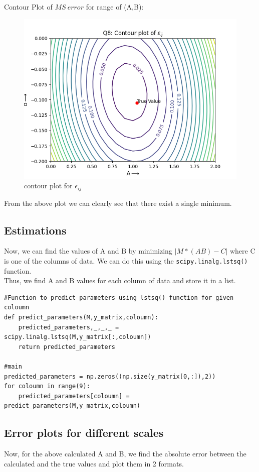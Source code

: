 \documentclass[11pt, a4paper]{article}
\begin{document}
Contour Plot of $MS\ error$ for range of (A,B):
\begin{figure}[!tbh]
   	\centering
   	\includegraphics[scale=0.7]{Q8.png}  %
   	\caption{contour plot for $\epsilon_{ij}$ }
   	\label{fig:Contour plot}
   \end{figure}
From the above plot we can clearly see that there exist a single minimum.


\subsection{Estimations}
\par Now, we can find the values of A and B by minimizing $|M*(AB)-C|$ where C is one of the columns of data. We can do this using the \verb|scipy.linalg.lstsq()| function.\\
Thus, we find A and B values for each column of data and store it in a list.
\begin{lstlisting}
#Function to predict parameters using lstsq() function for given coloumn
def predict_parameters(M,y_matrix,coloumn):
	predicted_parameters,_,_,_ = scipy.linalg.lstsq(M,y_matrix[:,coloumn])
	return predicted_parameters

#main
predicted_parameters = np.zeros((np.size(y_matrix[0,:]),2))
for coloumn in range(9):
	predicted_parameters[coloumn] = predict_parameters(M,y_matrix,coloumn)
\end{lstlisting}

\subsection{Error plots for different scales}
\par Now, for the above calculated A and B, we find the absolute error between the calculated and the true values and plot them in 2 formats.\\
\end{document}
